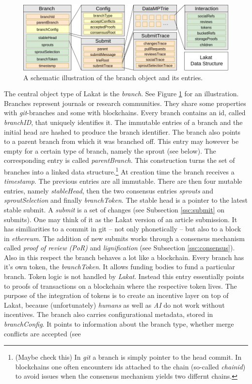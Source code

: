 \documentclass[14pt]{article}
\newcommand{\remark}[1]{{\color{purple} (#1)}}
\begin{document}
\begin{figure}[t!]
\begin{center}
\includegraphics[width=\textwidth]{src/img/BranchV9.png}
\end{center}
 \caption{A schematic illustration of the branch object and its entries.}
 \label{fig:branchstructure}
\end{figure}
The central object type of Lakat is the \textit{branch}. See Figure \ref{fig:branchstructure} for an illustration. Branches represent journals or research communities. They share some properties with \textit{git}-branches and some with blockchains. Every branch contains an id, called \textit{branchID}, that uniquely identifies it. The immutable entries of a branch and the initial head are hashed to produce the branch identifier. The branch also points to a parent branch from which it was branched off. This entry may however be empty for a certain type of branch, namely the sprout (see below). The corresponding entry is called \textit{parentBranch}. This construction turns the set of branches into a linked data structure.\footnote{\remark{Maybe check this} In \textit{git} a branch is simply pointer to the head commit. In blockchains one often encounters ids attached to the chain (so-called \textit{chainid}) to avoid issues when the consensus mechanism yields two differnt chains.} At creation time the branch receives a \textit{timestamp}. The previous entries are all immutable. There are then four mutable entries, namely \textit{stableHead}, then the two consensus entries \textit{sprouts} and \textit{sproutSelection} and finally \textit{branchToken}. The stable head is a pointer to the latest stable submit. A \textit{submit} is a set of changes (see Subsection \ref{ssc:submit} on submits). One may think of it as the Lakat version of an article submission. It has similiarities to a commit in git -- not only phonetically -- but also to a block in \textit{ethereum}. The addition of new submits works through a consensus mechanism called \textit{proof of review (PoR)} and \textit{lignification} (see Subsection \ref{ssc:consensus}). Also in this respect the branch behaves a lot like a blockchain. Every branch has it's own token, the \textit{branchToken}. It allows funding bodies to fund a particular branch. Token logic is not handled by \textit{Lakat}. Instead this entry essentially points to proofs of transactions on a blockchain where the respective token lives. The purpose of the integration of tokens is to create an incentive layer on top of Lakat, because (unfortunately) \textit{humans} as well as \textit{AI} do not work without incentives. The branch also carries configurational metadata, stored in \textit{branchConfig}. It points to information about the branch type, whether merge conflicts are accepted (see 
\end{document}
